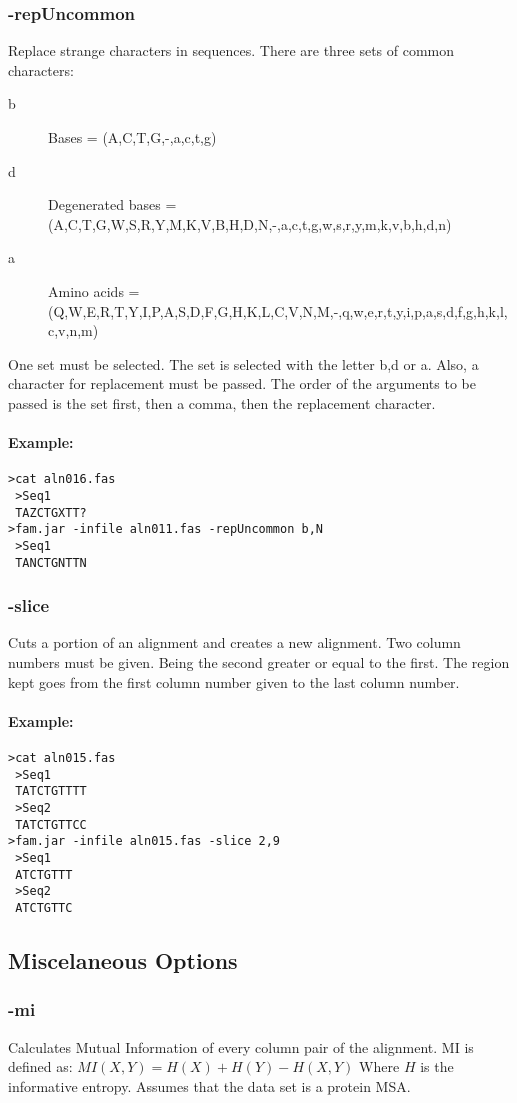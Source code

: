 \documentclass[a4paper, twoside,10pt]{article}
\begin{document}
\subsubsection{-repUncommon}
Replace strange characters in sequences.
There are three sets of common characters:
\begin{description}
  \item[b] Bases = (A,C,T,G,-,a,c,t,g)
  \item[d] Degenerated bases = (A,C,T,G,W,S,R,Y,M,K,V,B,H,D,N,-,a,c,t,g,w,s,r,y,m,k,v,b,h,d,n)
  \item[a] Amino acids = (Q,W,E,R,T,Y,I,P,A,S,D,F,G,H,K,L,C,V,N,M,-,q,w,e,r,t,y,i,p,a,s,d,f,g,h,k,l,c,v,n,m)
\end{description}
One set must be selected. The set is selected with the letter b,d or a.
Also, a character for replacement must be passed. The order of the arguments to
be passed is the set first, then a comma, then the replacement character.
 
\paragraph{Example:}
\begin{verbatim}
>cat aln016.fas
 >Seq1
 TAZCTGXTT?
>fam.jar -infile aln011.fas -repUncommon b,N 
 >Seq1
 TANCTGNTTN
\end{verbatim}

\subsubsection{-slice}
Cuts a portion of an alignment and creates a new alignment. Two column numbers 
must be given. Being the second greater or equal to the first. The region kept
goes from the first column number given to the last column number. 
 
\paragraph{Example:}
\begin{verbatim}
>cat aln015.fas
 >Seq1
 TATCTGTTTT
 >Seq2
 TATCTGTTCC
>fam.jar -infile aln015.fas -slice 2,9
 >Seq1
 ATCTGTTT
 >Seq2
 ATCTGTTC
\end{verbatim}

\subsection{Miscelaneous Options}
\subsubsection{-mi}
Calculates Mutual Information of every column pair of the alignment. 
MI is defined as:
$MI (X,Y) = H(X) + H(Y) - H(X,Y) $
Where $H$ is the informative entropy. Assumes that the data set is a protein
MSA.
\end{document}
